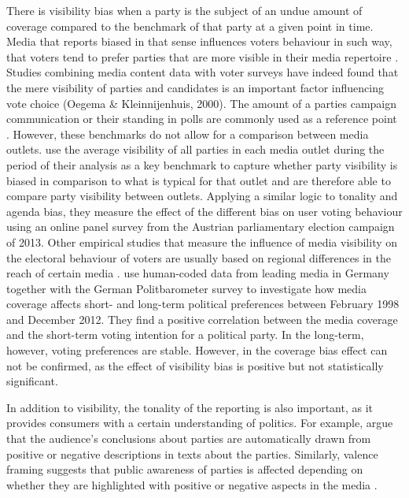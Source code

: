 \documentclass[12pt,a4paper,notitlepage]{article}
\begin{document}
There is visibility bias when a party is the subject of an undue amount of coverage compared to the benchmark of that party at a given point in time. Media that reports biased in that sense influences voters behaviour in such way, that voters tend to prefer parties that are more visible in their media repertoire \citep{eberl_one_2017}. Studies combining media content data with voter surveys have indeed found that the mere visibility of parties and candidates is an important factor influencing vote choice (Oegema & Kleinnijenhuis, 2000). The amount of a parties campaign communication or their standing in polls are commonly used as a reference point \citep{junque_de_fortuny_media_2012, hopmann_political_2012}. However, these benchmarks do not allow for a comparison between media outlets. \citet{eberl_one_2017} use the average visibility of all parties in each media outlet during the period of their analysis as a key benchmark to capture whether party visibility is biased in comparison to what is typical for that outlet and are therefore able to compare party visibility between outlets. Applying a similar logic to tonality and agenda bias, they measure the effect of the different bias on user voting behaviour using an online panel survey from the Austrian parliamentary election campaign of 2013. Other empirical studies that measure the influence of media visibility on the electoral behaviour of voters are usually based on regional differences in the reach of certain media \citep{enikolopov_media_2011, dellavigna_fox_2006, snyder_press_2010}. \citet{dewenter_can_2018} use human-coded data from leading media in Germany together with the German Politbarometer survey to investigate how media coverage affects short- and long-term political preferences between February 1998 and December 2012. They find a positive correlation between the media coverage and the short-term voting intention for a political party. In the long-term, however, voting preferences are stable. However, in \citet{eberl_one_2017} the coverage bias effect can not be confirmed, as the effect of visibility bias is positive but not statistically significant.

In addition to visibility, the tonality of the reporting is also important, as it provides consumers with a certain understanding of politics. For example, \citet{druckman_impact_2005} argue that the audience's conclusions about parties are automatically drawn from positive or negative descriptions in texts about the parties. Similarly, valence framing suggests that public awareness of parties is affected depending on whether they are highlighted with positive or negative aspects in the media \citep{de_vreese_valenced_2006, hurtikova_importance_2017}.  
\end{document}
